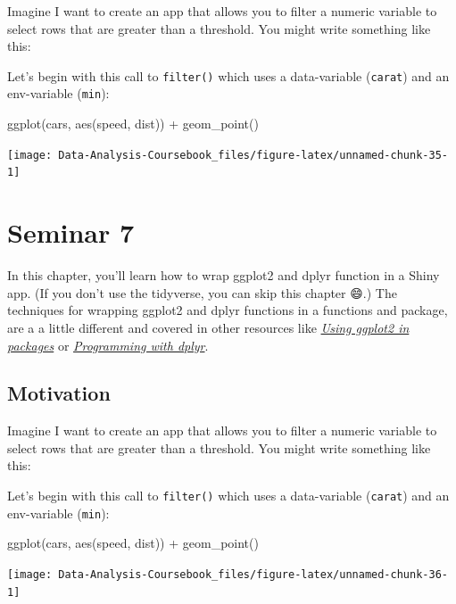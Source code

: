\documentclass[
]{article}
\newenvironment{Shaded}{\begin{snugshade}}{\end{snugshade}}
\newcommand{\FunctionTok}[1]{\textcolor[rgb]{0.00,0.00,0.00}{#1}}
\newcommand{\NormalTok}[1]{#1}
\newcommand{\SpecialCharTok}[1]{\textcolor[rgb]{0.00,0.00,0.00}{#1}}
\begin{document}
Imagine I want to create an app that allows you to filter a numeric variable to select rows that are greater than a threshold.
You might write something like this:

Let's begin with this call to \texttt{filter()} which uses a data-variable (\texttt{carat}) and an env-variable (\texttt{min}):

\begin{Shaded}
\begin{Highlighting}[]
\FunctionTok{ggplot}\NormalTok{(cars, }\FunctionTok{aes}\NormalTok{(speed, dist)) }\SpecialCharTok{+} 
  \FunctionTok{geom\_point}\NormalTok{()}
\end{Highlighting}
\end{Shaded}

\begin{center}\texttt{[image: Data-Analysis-Coursebook\_files/figure-latex/unnamed-chunk-35-1]} \end{center}

\hypertarget{seminar7}{%
\section{Seminar 7}\label{seminar7}}

In this chapter, you'll learn how to wrap ggplot2 and dplyr function in a Shiny app.
(If you don't use the tidyverse, you can skip this chapter 😄.) The techniques for wrapping ggplot2 and dplyr functions in a functions and package, are a a little different and covered in other resources like \href{http://ggplot2.tidyverse.org/dev/articles/ggplot2-in-packages.html}{\emph{Using ggplot2 in packages}} or \href{http://dplyr.tidyverse.org/articles/programming.html}{\emph{Programming with dplyr}}.

\hypertarget{tidy-motivation}{%
\subsection{Motivation}\label{tidy-motivation}}

Imagine I want to create an app that allows you to filter a numeric variable to select rows that are greater than a threshold.
You might write something like this:

Let's begin with this call to \texttt{filter()} which uses a data-variable (\texttt{carat}) and an env-variable (\texttt{min}):

\begin{Shaded}
\begin{Highlighting}[]
\FunctionTok{ggplot}\NormalTok{(cars, }\FunctionTok{aes}\NormalTok{(speed, dist)) }\SpecialCharTok{+} 
  \FunctionTok{geom\_point}\NormalTok{()}
\end{Highlighting}
\end{Shaded}

\begin{center}\texttt{[image: Data-Analysis-Coursebook\_files/figure-latex/unnamed-chunk-36-1]} \end{center}

  
\end{document}
